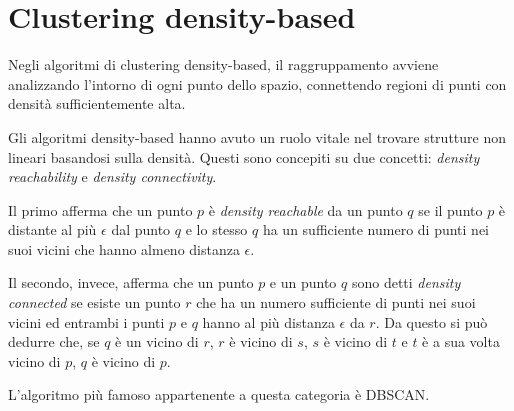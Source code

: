 \section{Clustering density-based}
	Negli algoritmi di clustering density-based, il raggruppamento avviene analizzando l'intorno di ogni punto dello spazio, connettendo regioni di punti con densità sufficientemente alta\cite{Density_based_clustering}.
		
	Gli algoritmi density-based hanno avuto un ruolo vitale nel trovare strutture non lineari basandosi sulla densità. Questi sono concepiti su due concetti: \emph{density reachability} e \emph{density connectivity}.

	Il primo afferma che un punto $p$ è \emph{density reachable} da un punto $q$ se il punto $p$ è distante al più $\epsilon$ dal punto $q$ e lo stesso $q$ ha un sufficiente numero di punti nei suoi vicini che hanno almeno distanza $\epsilon$\cite{density_based_concept}. 

	Il secondo, invece, afferma che un punto $p$ e un punto $q$ sono detti \emph{density connected} se esiste un punto $r$ che ha un numero sufficiente di punti nei suoi vicini ed entrambi i punti $p$ e $q$ hanno al più distanza $\epsilon$ da $r$. Da questo si può dedurre che, se $q$ è un vicino di $r$, $r$ è vicino di $s$, $s$ è vicino di $t$ e $t$ è a sua volta vicino di $p$, $q$ è vicino di $p$\cite{density_based_concept}.

	L'algoritmo più famoso appartenente a questa categoria è DBSCAN.
